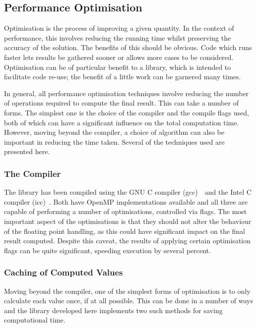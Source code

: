 \subsection{Performance Optimisation}

Optimisation is the process of improving a given quantity.
In the context of performance, this involves reducing the running time whilst
preserving the accuracy of the solution.
The benefits of this should be obvious.
Code which runs faster lets results be gathered sooner or allows more cases to
be considered.
Optimisation can be of particular benefit to a library, which is intended to
facilitate code re-use; the benefit of a little work can be garnered many
times.

In general, all performance optimisation techniques involve reducing the number
of operations required to compute the final result.
This can take a number of forms.
The simplest one is the choice of the compiler and the compile flags used, both
of which can have a significant influence on the total computation time.
However, moving beyond the compiler, a choice of algorithm can also be important
in reducing the time taken.
Several of the techniques used are presented here.

\subsubsection{The Compiler}

The library has been compiled using the GNU C compiler (gcc)~\cite{gcc}\ and the
Intel C compiler (icc)~\cite{icc}.
Both have OpenMP implementations available and all three are capable of
performing a number of optimisations, controlled via flags.
The most important
aspect of the
optimisations is that they should not alter the behaviour of the floating point
handling, as this could have significant impact on the final result computed.
Despite this caveat, the results of applying certain optimisation flags can be
quite significant, speeding execution by several percent.

\subsubsection{Caching of Computed Values}

Moving beyond the compiler, one of the simplest forms of optimisation is to only
calculate each value once, if at all possible.  This can be done in a number of
ways and the library developed here implements two such methods for saving
computational time.

